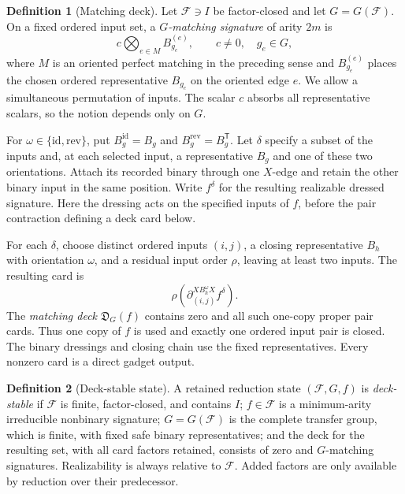\documentclass[11pt,letterpaper,onecolumn]{article}
\theoremstyle{plain}
\theoremstyle{definition}
\newtheorem{definition}[definition]{Definition}
\theoremstyle{remark}
\newcommand{\cF}{\mathcal F}
\begin{document}
\begin{definition}[Matching deck]
\label{def:matching-deck}
Let \(\cF\ni I\) be factor-closed and let \(G=G(\cF)\).  On a fixed
ordered input set, a \emph{\(G\)-matching signature} of arity \(2m\) is
\begin{equation*}
  c\bigotimes_{e\in M}B_{g_e}^{(e)},
  \qquad
  c\ne0,\quad g_e\in G,
\end{equation*}
where \(M\) is an oriented perfect matching in the preceding sense and
\(B_{g_e}^{(e)}\) places the chosen ordered representative \(B_{g_e}\) on
the oriented edge \(e\).  We allow a simultaneous permutation of inputs. The
scalar \(c\) absorbs all representative scalars, so the notion depends only
on \(G\).

For \(\omega\in\{\mathrm{id},\mathrm{rev}\}\), put
\(B_g^{\mathrm{id}}=B_g\) and
\(B_g^{\mathrm{rev}}=B_g^{\mathsf T}\).  Let \(\delta\) specify a subset of the inputs and, at each selected input, a representative
\(B_g\) and one of these two orientations.  Attach its recorded binary through
one \(X\)-edge and retain the other binary input in the same position.
Write \(f^\delta\) for the resulting realizable dressed signature.
Here the dressing acts on the specified inputs of \(f\), before the pair
contraction defining a deck card below.

For each \(\delta\), choose distinct ordered inputs \((i,j)\), a closing
representative \(B_h\) with orientation \(\omega\), and a residual input order \(\rho\), leaving at least two inputs.  The resulting card is
\[
 \rho\!\left(\partial_{(i,j)}^{XB_h^\omega X}f^\delta\right).
\]
The \emph{matching deck} \(\mathfrak D_G(f)\) contains zero and all such
one-copy proper pair cards.  Thus one copy of \(f\) is used and exactly one
ordered input pair is closed. The binary dressings and closing chain use the
fixed representatives.  Every nonzero card is a direct gadget output.
\end{definition}

\begin{definition}[Deck-stable state]
\label{def:deck-stable-state}
A retained reduction state \((\cF,G,f)\) is \emph{deck-stable} if \(\cF\) is
finite, factor-closed, and contains \(I\); \(f\in\cF\) is a
minimum-arity irreducible nonbinary signature; \(G=G(\cF)\) is the
complete transfer group, which is finite, with fixed safe binary representatives;
and the deck for the resulting set, with all card factors retained, consists of zero
and \(G\)-matching signatures.  Realizability is always relative to \(\cF\).
Added factors are only available by reduction over their predecessor.
\end{definition}
\end{document}
